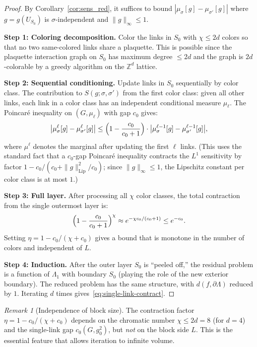 \documentclass[11pt,a4paper]{article}
\theoremstyle{plain}
\theoremstyle{definition}
\theoremstyle{remark}
\newtheorem{remark}[theorem]{Remark}
\newcommand{\Z}{\mathbb{Z}}
\begin{document}
\begin{proof}
By Corollary~\ref{cor:sens_red}, it suffices to bound
$|\mu_\sigma[g] - \mu_{\sigma'}[g]|$ where $g = g(U_{S_0})$
is $\sigma$-independent and $\|g\|_\infty \le 1$.

\textbf{Step 1: Coloring decomposition.}
Color the links in $S_0$ with $\chi \le 2d$ colors so that
no two same-colored links share a plaquette.  This is possible
since the plaquette interaction graph on $S_0$ has maximum
degree $\le 2d$ and the graph is $2d$-colorable by a greedy
algorithm on the $\Z^d$ lattice.

\textbf{Step 2: Sequential conditioning.}
Update links in $S_0$ sequentially by color class.
The contribution to $S(g;\sigma,\sigma')$ from the first
color class: given all other links, each link in a color
class has an independent conditional measure $\mu_\ell$.
The Poincar\'e inequality on $(G,\mu_\ell)$ with gap $c_0$ gives:
\[
  \bigl|\mu_\sigma^\ell[g] - \mu_{\sigma'}^\ell[g]\bigr|
  \le \Bigl(1 - \frac{c_0}{c_0 + 1}\Bigr)
  \cdot \bigl|\mu_\sigma^{\ell-1}[g] - \mu_{\sigma'}^{\ell-1}[g]\bigr|,
\]
where $\mu^\ell$ denotes the marginal after updating the
first $\ell$ links.  (This uses the standard fact that a
$c_0$-gap Poincar\'e inequality contracts the $L^1$ sensitivity
by factor $1 - c_0/(c_0 + \|g\|_{\mathrm{Lip}}^2/c_0)$; since
$\|g\|_\infty \le 1$, the Lipschitz constant per color class
is at most $1$.)

\textbf{Step 3: Full layer.}
After processing all $\chi$ color classes, the total contraction
from the single outermost layer is:
\[
  \Bigl(1 - \frac{c_0}{c_0+1}\Bigr)^\chi
  \approx e^{-\chi c_0/(c_0+1)} \le e^{-c_0}.
\]
Setting $\eta = 1 - c_0/(\chi + c_0)$ gives a bound that is
monotone in the number of colors and independent of $L$.

\textbf{Step 4: Induction.}
After the outer layer $S_0$ is ``peeled off,'' the residual problem
is a function of $\Lambda_1$ with boundary $S_0$ (playing the role
of the new exterior boundary). The reduced problem has the same
structure, with $d(f, \partial\Lambda)$ reduced by $1$.  Iterating
$d$ times gives~\eqref{eq:single-link-contract}.
\end{proof}

\begin{remark}[Independence of block size]
The contraction factor $\eta = 1 - c_0/(\chi+c_0)$ depends
on the chromatic number $\chi \le 2d = 8$ (for $d=4$) and the
single-link gap $c_0(G, g_0^2)$, but \emph{not} on the block
side $L$.  This is the essential feature that allows iteration
to infinite volume.
\end{remark}
\end{document}
